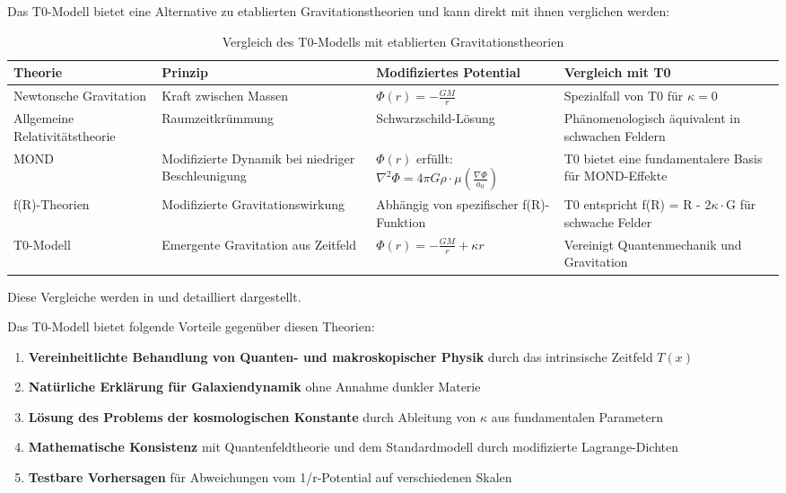 \documentclass[12pt,a4paper]{article}
\begin{document}
Das T0-Modell bietet eine Alternative zu etablierten Gravitationstheorien und kann direkt mit ihnen verglichen werden:

\begin{table}[H]
	\centering
	\begin{tabular}{p{3cm}p{3cm}p{4cm}p{4cm}}
		\toprule
		\textbf{Theorie} & \textbf{Prinzip} & \textbf{Modifiziertes Potential} & \textbf{Vergleich mit T0} \\
		\midrule
		Newtonsche Gravitation & Kraft zwischen Massen & $\Phi(r) = -\frac{GM}{r}$ & Spezialfall von T0 für $\kappa=0$ \\
		Allgemeine Relativitätstheorie & Raumzeitkrümmung & Schwarzschild-Lösung & Phänomenologisch äquivalent in schwachen Feldern \\
		MOND & Modifizierte Dynamik bei niedriger Beschleunigung & $\Phi(r)$ erfüllt: $\nabla^2\Phi = 4\pi G\rho\cdot\mu(\frac{\nabla\Phi}{a_0})$ & T0 bietet eine fundamentalere Basis für MOND-Effekte \\
		f(R)-Theorien & Modifizierte Gravitationswirkung & Abhängig von spezifischer f(R)-Funktion & T0 entspricht f(R) = R - 2$\kappa\cdot$G für schwache Felder \\
		T0-Modell & Emergente Gravitation aus Zeitfeld & $\Phi(r) = -\frac{GM}{r} + \kappa r$ & Vereinigt Quantenmechanik und Gravitation \\
		\bottomrule
	\end{tabular}
	\caption{Vergleich des T0-Modells mit etablierten Gravitationstheorien}
	\label{tab:theory_comparison}
\end{table}

Diese Vergleiche werden in \cite{pascher_galaxies_2025} und \cite{pascher_emergente_gravitation_2025} detailliert dargestellt.

Das T0-Modell bietet folgende Vorteile gegenüber diesen Theorien:

\begin{enumerate}
	\item \textbf{Vereinheitlichte Behandlung von Quanten- und makroskopischer Physik} durch das intrinsische Zeitfeld $T(x)$
	\item \textbf{Natürliche Erklärung für Galaxiendynamik} ohne Annahme dunkler Materie
	\item \textbf{Lösung des Problems der kosmologischen Konstante} durch Ableitung von $\kappa$ aus fundamentalen Parametern
	\item \textbf{Mathematische Konsistenz} mit Quantenfeldtheorie und dem Standardmodell durch modifizierte Lagrange-Dichten
	\item \textbf{Testbare Vorhersagen} für Abweichungen vom 1/r-Potential auf verschiedenen Skalen
\end{enumerate}
\end{document}
